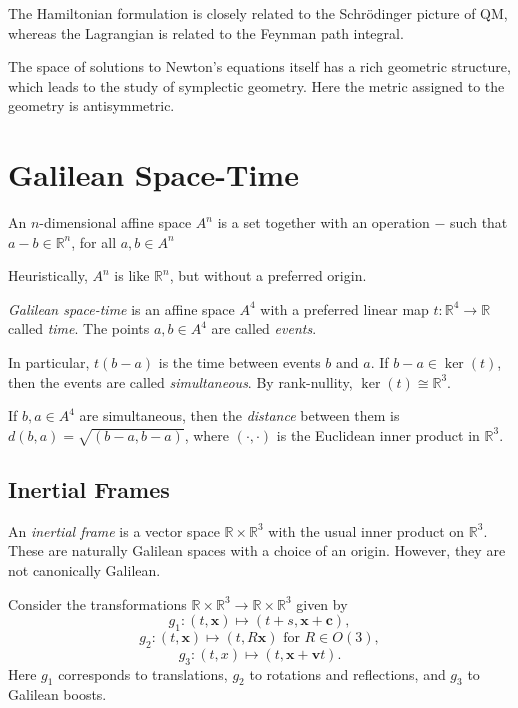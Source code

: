 \documentclass[12pt]{article}
\begin{document}
The Hamiltonian formulation is closely related to the Schr\"{o}dinger picture of QM, whereas the Lagrangian is related to the Feynman path integral.

The space of solutions to Newton's equations itself has a rich geometric structure, which leads to the study of symplectic geometry. Here the metric assigned to the geometry is antisymmetric.

\newpage

\section{Galilean Space-Time}
\label{sec:galilean_st}

An $n$-dimensional affine space $A^{n}$ is a set together with an operation $-$ such that $a - b \in \mathbb{R}^{n}$, for all $a, b \in A^{n}$

Heuristically, $A^{n}$ is like $\mathbb{R}^{n}$, but without a preferred origin.

\emph{Galilean space-time} is an affine space $A^4$ with a preferred linear map $t : \mathbb{R}^{4} \to \mathbb{R}$ called \emph{time}. The points $a, b \in A^4$ are called \emph{events}.

In particular, $t(b-a)$ is the time between events $b$ and $a$. If $b - a \in \ker(t)$, then the events are called \emph{simultaneous}. By rank-nullity, $\ker(t) \cong \mathbb{R}^3$.

If $b, a \in A^{4}$ are simultaneous, then the \emph{distance} between them is $d(b, a) = \sqrt{(b-a,b-a)}$, where $(\cdot, \cdot)$ is the Euclidean inner product in $\mathbb{R}^3$.

\subsection{Inertial Frames}
\label{sub:in_f}

An \emph{inertial frame} is a vector space $\mathbb{R} \times \mathbb{R}^3$ with the usual inner product on $\mathbb{R}^3$. These are naturally Galilean spaces with a choice of an origin. However, they are not canonically Galilean.

Consider the transformations $\mathbb{R} \times \mathbb{R}^3 \to \mathbb{R} \times \mathbb{R}^3$ given by
\[
g_1 : (t, \mathbf{x}) \mapsto (t+s, \mathbf{x} + \mathbf{c}),
\]
\[
	g_2 : (t, \mathbf{x}) \mapsto (t, R\mathbf{x}) \text{ for }R \in O(3),
\]
\[
g_3 : (t, x) \mapsto (t, \mathbf{x} + \mathbf{v}t).
\]
Here $g_1$ corresponds to translations, $g_2$ to rotations and reflections, and $g_3$ to Galilean boosts.
\end{document}
